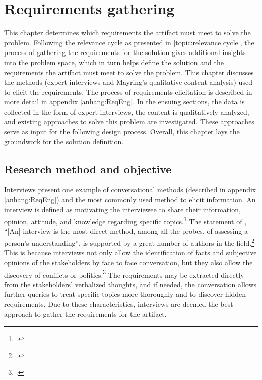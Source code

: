 \chapter{Requirements gathering} \label{chap:ReqEng}

This chapter determines which requirements the artifact must meet to solve the problem. Following the relevance cycle as presented in \ref{topic:relevance cycle}, the process of gathering the requirements for the solution gives additional insights into the problem space, which in turn helps define the solution and the requirements the artifact must meet to solve the problem. This chapter discusses the methods (expert interviews and Mayring's qualitative content analysis) used to elicit the requirements. The process of requirements elicitation is described in more detail in appendix \ref{anhang:ReqEng}. In the ensuing sections, the data is collected in the form of expert interviews, the content is qualitatively analyzed, and existing approaches to solve this problem are investigated. These approaches serve as input for the following design process. Overall, this chapter lays the groundwork for the solution definition.

\section{Research method and objective}
Interviews present one example of conversational methods (described in appendix \ref{anhang:ReqEng}) and the most commonly used method to elicit information. An interview is defined as motivating the interviewee to share their information, opinion, attitude, and knowledge regarding specific topics.\footcite[Cf.][p.133]{KrugerqualitativeInhaltsanalyseMethode2004} The statement of \cite{WhiteProbingunderstanding1992}, \enquote{[An] interview is the most direct method, among all the probes, of assessing a person’s understanding}, is supported by a great number of authors in the field.\footcites[Cf.][p.174]{MacaulayRequirementscapturecooperative1993}[cf.][p.105]{SommervilleSoftwareengineering2011}[cf.][p.25]{ZowghiRequirementselicitationsurvey2005}[cf.][p.172]{HickeyElicitationtechniqueselection2003}[cf.][p.227]{ZhangEffectiverequirementsdevelopmentA2007}[cf.][p.92]{MasonQualitativeresearching2002} This is because interviews not only allow the identification of facts and subjective opinions of the stakeholders by face to face conversation, but they also allow the discovery of conflicts or politics.\footcites[Cf.][p.2]{TiwariMethodologySelectionRequirement2017} The requirements may be extracted directly from the stakeholders' verbalized thoughts, and if needed, the conversation allows further queries to treat specific topics more thoroughly and to discover hidden requirements. Due to these characteristics, interviews are deemed the best approach to gather the requirements for the artifact.

